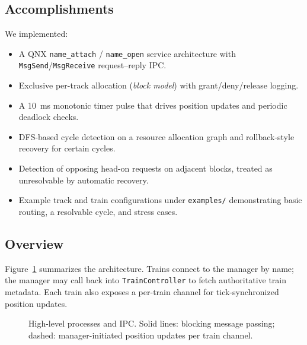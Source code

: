 \documentclass[11pt,a4paper]{article}
\begin{document}
\subsection{Accomplishments}
We implemented:
\begin{itemize}[noitemsep]
  \item A QNX \texttt{name\_attach} / \texttt{name\_open} service architecture with \texttt{MsgSend}/\texttt{MsgReceive} request--reply IPC.
  \item Exclusive per-track allocation (\emph{block model}) with grant/deny/release logging.
  \item A \SI{10}{\milli\second} monotonic timer pulse that drives position updates and periodic deadlock checks.
  \item DFS-based cycle detection on a resource allocation graph and rollback-style recovery for certain cycles.
  \item Detection of opposing head-on requests on adjacent blocks, treated as unresolvable by automatic recovery.
  \item Example track and train configurations under \texttt{examples/} demonstrating basic routing, a resolvable cycle, and stress cases.
\end{itemize}

\subsection{Overview}
Figure~\ref{fig:arch} summarizes the architecture. Trains connect to the manager by name; the manager may call back into \texttt{TrainController} to fetch authoritative train metadata. Each train also exposes a per-train channel for tick-synchronized position updates.

\begin{figure}[htbp]
  \centering
  \caption{High-level processes and IPC. Solid lines: blocking message passing; dashed: manager-initiated position updates per train channel.}
  \label{fig:arch}
\end{figure}
\end{document}
